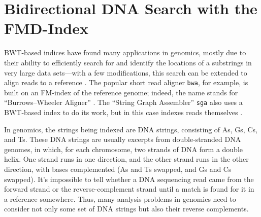 \documentclass[11pt,proposal]{ucthesis}
\begin{document}

    
    
    
    
        
        

\section{Bidirectional DNA Search with the FMD-Index}

BWT-based indices have found many applications in genomics, mostly due to their ability to efficiently search for and identify the locations of a substrings in very large data sets---with a few modifications, this search can be extended to align reads to a reference \cite{li2014bwa}. The popular short read aligner \texttt{bwa}, for example, is built on an FM-index of the reference genome; indeed, the name stands for ``Burrows--Wheeler Aligner'' \cite{li2014bwa,li2009fast}. The ``String Graph Assembler'' \texttt{sga} also uses a BWT-based index to do its work, but in this case indexes reads themselves \cite{simpson2012efficient}.

In genomics, the strings being indexed are DNA strings, consisting of As, Gs, Cs, and Ts. These DNA strings are usually excerpts from double-stranded DNA genomes, in which, for each chromosome, two strands of DNA form a double helix. One strand runs in one direction, and the other strand runs in the other direction, with bases complemented (As and Ts swapped, and Gs and Cs swapped). It's impossible to tell whether a DNA sequencing read came from the forward strand or the reverse-complement strand until a match is found for it in a reference somewhere. Thus, many analysis problems in genomics need to consider not only some set of DNA strings but also their reverse complements.
\end{document}
